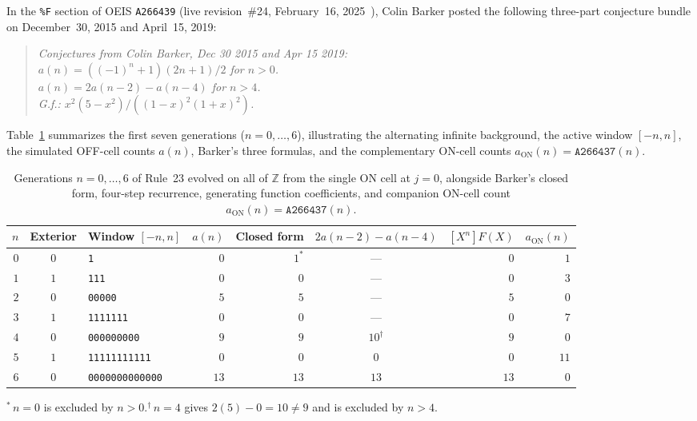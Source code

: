 \documentclass[11pt]{article}
\theoremstyle{definition}
\newcommand{\Z}{\mathbb{Z}}
\newcommand{\seq}[1]{\texttt{#1}}
\begin{document}
In the \texttt{\%F} section of OEIS \seq{A266439} (live revision~\#24, February~16, 2025~\cite{oeis266439}), Colin Barker posted the following three-part conjecture bundle on December~30, 2015 and April~15, 2019:
\begin{quote}\itshape
Conjectures from Colin Barker, Dec 30 2015 and Apr 15 2019:\\
$a(n) = ((-1)^n + 1)(2n + 1)/2$ for $n > 0$.\\
$a(n) = 2a(n - 2) - a(n - 4)$ for $n > 4$.\\
G.f.: $x^2(5 - x^2) / ((1 - x)^2(1 + x)^2)$.
\end{quote}
Table~\ref{tab:small-n} summarizes the first seven generations ($n = 0, \dots, 6$), illustrating the alternating infinite background, the active window $[-n, n]$, the simulated OFF-cell counts $a(n)$, Barker's three formulas, and the complementary ON-cell counts $a_{\mathrm{ON}}(n) = \seq{A266437}(n)$.

\begin{table}[ht]
\centering
\caption{Generations $n = 0, \dots, 6$ of Rule~23 evolved on all of $\Z$ from the single ON cell at $j = 0$, alongside Barker's closed form, four-step recurrence, generating function coefficients, and companion ON-cell count $a_{\mathrm{ON}}(n) = \seq{A266437}(n)$.}
\label{tab:small-n}
\smallskip
{\small
\begin{tabular}{@{}r c l r r c r r@{}}
\toprule
$n$ & Exterior & Window $[-n, n]$ & $a(n)$ & Closed form & $2a(n-2) - a(n-4)$ & $[X^n]F(X)$ & $a_{\mathrm{ON}}(n)$ \\
\midrule
$0$ & $0$ & \texttt{1} & $0$ & $1^*$ & --- & $0$ & $1$ \\
$1$ & $1$ & \texttt{111} & $0$ & $0$ & --- & $0$ & $3$ \\
$2$ & $0$ & \texttt{00000} & $5$ & $5$ & --- & $5$ & $0$ \\
$3$ & $1$ & \texttt{1111111} & $0$ & $0$ & --- & $0$ & $7$ \\
$4$ & $0$ & \texttt{000000000} & $9$ & $9$ & $10^\dagger$ & $9$ & $0$ \\
$5$ & $1$ & \texttt{11111111111} & $0$ & $0$ & $0$ & $0$ & $11$ \\
$6$ & $0$ & \texttt{0000000000000} & $13$ & $13$ & $13$ & $13$ & $0$ \\
\bottomrule
\end{tabular}

\smallskip
{\footnotesize ${}^*$\,$n = 0$ is excluded by $n > 0$.\quad ${}^\dagger$\,$n = 4$ gives $2(5) - 0 = 10 \ne 9$ and is excluded by $n > 4$.}
}
\end{table}
\end{document}

